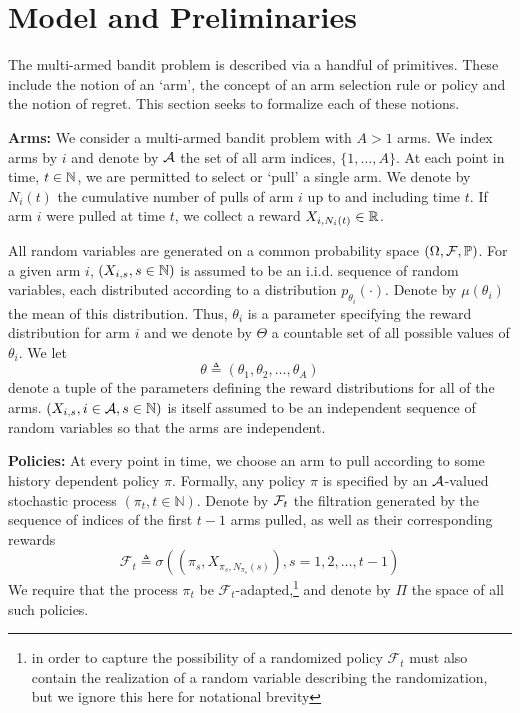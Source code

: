 \section{Model and Preliminaries} \label{sec:model_and_prelim}

The multi-armed bandit problem is described via a handful of primitives. These include the notion of an `arm', the concept of an arm selection rule or policy and the notion of regret. This section seeks to formalize each of these notions. 

\noindent\textbf{\textsf{Arms:}}
We consider a multi-armed bandit problem with $A > 1$ arms. We index arms by $i$ and denote by $\mathcal A$ the set of all arm indices, $\{1,\ldots,A\}$. At each point in time, $t \in \mathbb{N}$, we are permitted to select or `pull' a single arm. We denote by $N_i(t)$ the cumulative number of pulls of arm $i$ up to and including time $t$. If arm $i$ were pulled at time $t$, we collect a reward  $X_{i,N_i(t)} \in \mathbb{R}$. 

All random variables are generated on a common probability space $\left(\Omega, \mathcal F, \mathbb{P}\right)$. For a given arm $i$, $(X_{i,s}, s \in \mathbb{N})$ is assumed to be an i.i.d. sequence of random variables, each distributed according to a distribution $p_{\theta_i}(\cdot)$. Denote by $\mu(\theta_i)$ the mean of this distribution. Thus, $\theta_i$ is a parameter specifying the reward distribution for arm $i$ and we denote by $\Theta$ a countable set of all possible values of $\theta_i$. 
We let 
\[
\theta \triangleq \left(\theta_1,\theta_2, \dots, \theta_A\right)
\]
denote a tuple of the parameters defining the reward distributions for all of the arms. $(X_{i,s}, i \in \mathcal A, s \in \mathbb{N})$ is itself assumed to be an independent sequence of random variables so that the arms are independent. 


\noindent\textbf{\textsf{Policies:}} At every point in time, we choose an arm to pull according to some history dependent policy $\pi$. Formally, any policy $\pi$ is specified by an $\mathcal A$-valued stochastic process $(\pi_t, t \in \mathbb{N})$. Denote by $\mathcal F_t$ the filtration generated by the sequence of indices of the first $t-1$ arms pulled, as well as their corresponding rewards
\[
\mathcal{F}_t
\triangleq
\sigma\left(
\left(
\pi_s, X_{\pi_s,N_{\pi_s}(s)}
\right)
, s=1,2,\dots,t-1
\right)
\]
We require that the process $\pi_t$ be $\mathcal{F}_t$-adapted,\footnote{in order to capture the possibility of a randomized policy $\mathcal{F}_t$ must also contain the realization of a random variable describing the randomization, but we ignore this here for notational brevity} and denote by $\Pi$ the space of all such policies. 


